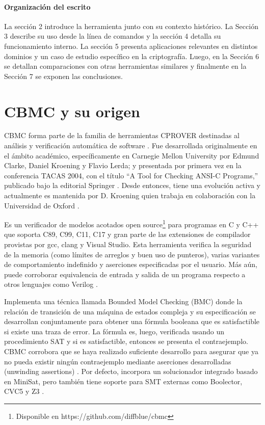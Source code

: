 \documentclass[runningheads]{llncs}
\begin{document}
\paragraph{Organización del escrito} La sección 2 introduce la herramienta junto con su contexto histórico.
La Sección 3 describe su uso desde la línea de comandos y la sección 4 detalla su funcionamiento interno.
La sección 5 presenta aplicaciones relevantes en distintos dominios y un caso de estudio específico en la criptografía.
Luego, en la Sección 6 se detallan comparaciones con otras herramientas similares y finalmente en la Sección 7 se exponen las conclusiones.

\section{CBMC y su origen}
CBMC forma parte de la familia de herramientas CPROVER destinadas al análisis y verificación automática de software \cite{cbmc-paper}.
Fue desarrollada originalmente en el ámbito académico, específicamente en Carnegie Mellon University por Edmund Clarke, Daniel Kroening y Flavio Lerda; y presentada por primera vez en la conferencia TACAS 2004, con el título “A Tool for Checking ANSI-C Programs,” publicado bajo la editorial Springer \cite{tacas-2004}.
Desde entonces, tiene una evolución activa y actualmente es mantenida por D. Kroening quien trabaja en colaboración con la Universidad de Oxford \cite{cbmc-paper}.

Es un verificador de modelos acotados open source\footnote[1]{Disponible en https://github.com/diffblue/cbmc} para programas en C y C++ que soporta C89, C99, C11, C17 y gran parte de las extensiones de compilador provistas por gcc, clang y Visual Studio.
Esta herramienta verifica la seguridad de la memoria (como límites de arreglos y buen uso de punteros), varias variantes de comportamiento indefinido y aserciones especificadas por el usuario.
Más aún, puede corroborar equivalencia de entrada y salida de un programa respecto a otros lenguajes como Verilog \cite{cbmc-website}.

Implementa una técnica llamada Bounded Model Checking (BMC) donde la relación de transición de una máquina de estados compleja y su especificación se desarrollan conjuntamente para obtener una fórmula booleana que es satisfactible si existe una traza de error.
La fórmula es, luego, verificada usando un procedimiento SAT y si es satisfactible, entonces se presenta el contraejemplo.
CBMC corrobora que se haya realizado suficiente desarrollo para asegurar que ya no pueda existir ningún contraejemplo mediante aserciones desarrolladas (unwinding assertions) \cite{tacas-2004}.
Por defecto, incorpora un solucionador integrado basado en MiniSat, pero también tiene soporte para SMT externas como Boolector, CVC5 y Z3 \cite{cbmc-website}.
\end{document}
